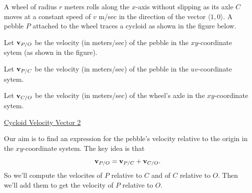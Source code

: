 \documentclass{ximera}
\begin{document}
\begin{question} \label{Qpew3r3r}

A wheel of radius $r$ meters rolls along the $x$-axis without slipping as its axle $C$ moves at a constant speed of $v$ m/sec in the direction of the vector $\langle 1, 0\rangle$. A pebble $P$ attached to the wheel traces a cycloid as shown in the figure below. 

Let ${\bf v}_{P/O}$ be the velocity (in meters/sec) of the pebble in the $xy$-coordinate sytem (as shown in the figure).

Let ${\bf v}_{P/C}$ be the velocity (in meters/sec) of the pebble in the $uv$-coordinate sytem.

Let ${\bf v}_{C/O}$ be the velocity (in meters/sec) of the wheel's axle in the $xy$-coordinate sytem.

 

\begin{onlineOnly}
    \begin{center}
\end{center}
\end{onlineOnly}

\href{https://www.desmos.com/calculator/gxryrk97bf}{Cycloid Velocity Vector 2}

Our aim is to find an expression for the pebble's velocity relative to the origin in the $xy$-coordinate system. The key idea is that 
\[
   {\bf v}_{P/O} = {\bf v}_{P/C} + {\bf v}_{C/O}.
\]
So we'll compute the velocites of $P$ relative to $C$ and of $C$ relative to $O$. Then we'll add them to get the velocity of $P$ relative to $O$.


\end{question}
\end{document}

